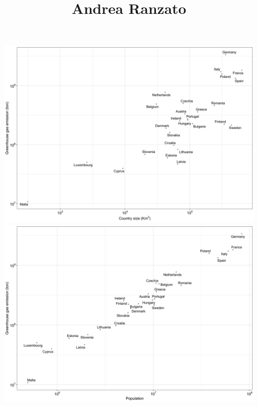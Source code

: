 \documentclass[a4paper]{article}
\begin{document}
\title{Andrea Ranzato}
\date{}
\maketitle

\thispagestyle{empty}

\begin{center}
\includegraphics[width=.35\linewidth]{plots/dimension.png}
\\[\baselineskip]
\includegraphics[width=.35\linewidth]{plots/population.png}


\end{center}
\end{document}
